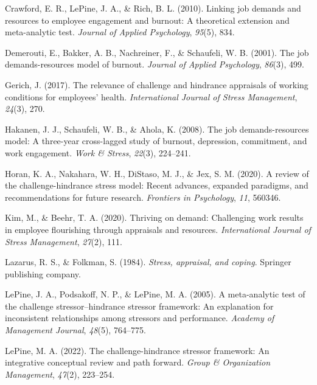 \documentclass[
  man,mask]{apa7}
\newlength{\cslhangindent}
\newlength{\cslentryspacingunit} %
\newenvironment{CSLReferences}[2] %
 {%
  \setlength{\parindent}{0pt}
  \ifodd #1
  \let\oldpar\par
  \def\par{\hangindent=\cslhangindent\oldpar}
  \fi
  \setlength{\parskip}{#2\cslentryspacingunit}
 }%
 {}
\begin{document}
\begin{CSLReferences}{1}{0}
\leavevmode{}%
Crawford, E. R., LePine, J. A., \& Rich, B. L. (2010). Linking job demands and resources to employee engagement and burnout: A theoretical extension and meta-analytic test. \emph{Journal of Applied Psychology}, \emph{95}(5), 834.

\leavevmode{}%
Demerouti, E., Bakker, A. B., Nachreiner, F., \& Schaufeli, W. B. (2001). The job demands-resources model of burnout. \emph{Journal of Applied Psychology}, \emph{86}(3), 499.

\leavevmode{}%
Gerich, J. (2017). The relevance of challenge and hindrance appraisals of working conditions for employees' health. \emph{International Journal of Stress Management}, \emph{24}(3), 270.

\leavevmode{}%
Hakanen, J. J., Schaufeli, W. B., \& Ahola, K. (2008). The job demands-resources model: A three-year cross-lagged study of burnout, depression, commitment, and work engagement. \emph{Work \& Stress}, \emph{22}(3), 224--241.

\leavevmode{}%
Horan, K. A., Nakahara, W. H., DiStaso, M. J., \& Jex, S. M. (2020). A review of the challenge-hindrance stress model: Recent advances, expanded paradigms, and recommendations for future research. \emph{Frontiers in Psychology}, \emph{11}, 560346.

\leavevmode{}%
Kim, M., \& Beehr, T. A. (2020). Thriving on demand: Challenging work results in employee flourishing through appraisals and resources. \emph{International Journal of Stress Management}, \emph{27}(2), 111.

\leavevmode{}%
Lazarus, R. S., \& Folkman, S. (1984). \emph{Stress, appraisal, and coping}. Springer publishing company.

\leavevmode{}%
LePine, J. A., Podsakoff, N. P., \& LePine, M. A. (2005). A meta-analytic test of the challenge stressor--hindrance stressor framework: An explanation for inconsistent relationships among stressors and performance. \emph{Academy of Management Journal}, \emph{48}(5), 764--775.

\leavevmode{}%
LePine, M. A. (2022). The challenge-hindrance stressor framework: An integrative conceptual review and path forward. \emph{Group \& Organization Management}, \emph{47}(2), 223--254.


\end{CSLReferences}
\end{document}
